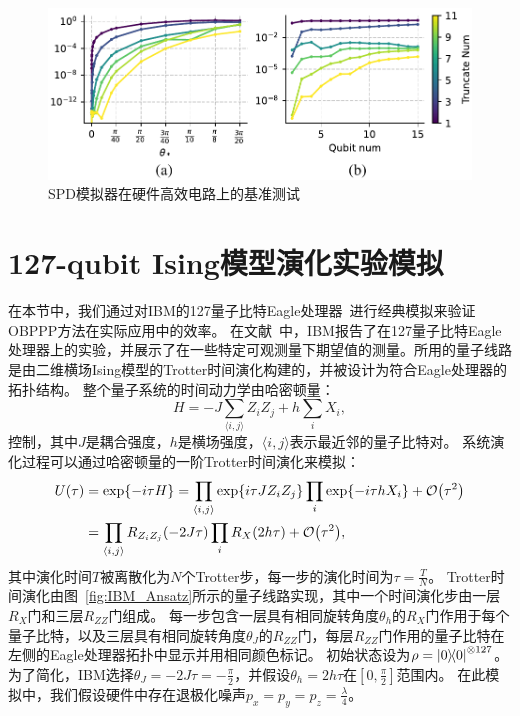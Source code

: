 \begin{figure}[!ht]
    \centering
\includegraphics[width=\textwidth]{figures/SPD_benchmark.pdf}
    \caption{SPD模拟器在硬件高效电路上的基准测试}
\label{fig:bench_mini_AQC}
\end{figure}

\section{127-qubit Ising模型演化实验模拟}



在本节中，我们通过对IBM的127量子比特Eagle处理器~\cite{kim2023evidence}进行经典模拟来验证OBPPP方法在实际应用中的效率。
在文献~\cite{kim2023evidence}中，IBM报告了在127量子比特Eagle处理器上的实验，并展示了在一些特定可观测量下期望值的测量。所用的量子线路是由二维横场Ising模型的Trotter时间演化构建的，并被设计为符合Eagle处理器的拓扑结构。
整个量子系统的时间动力学由哈密顿量：
\begin{equation}
  H=-J\sum_{\langle i,j\rangle} Z_iZ_j+h\sum_i X_i,
\end{equation}
控制，其中$J$是耦合强度，$h$是横场强度，$\langle i,j\rangle$表示最近邻的量子比特对。
系统演化过程可以通过哈密顿量的一阶Trotter时间演化来模拟：
\begin{equation}
    \begin{aligned}
        U(\tau)&=\exp{-i\tau H}=\prod_{\langle i,j\rangle} \exp{i\tau J Z_iZ_j}\prod_i \exp{-i\tau h X_i}+\order{\tau^2}\\
        &=\prod_{\langle i,j\rangle}R_{Z_iZ_j}(-2J\tau) \prod_i R_X(2h\tau)+\order{\tau^2},
    \end{aligned}
\end{equation}
其中演化时间$T$被离散化为$N$个Trotter步，每一步的演化时间为$\tau = \frac{T}{N}$。
Trotter时间演化由图~\ref{fig:IBM_Ansatz}所示的量子线路实现，其中一个时间演化步由一层$R_X$门和三层$R_{ZZ}$门组成。
每一步包含一层具有相同旋转角度$\theta_h$的$R_X$门作用于每个量子比特，以及三层具有相同旋转角度$\theta_J$的$R_{ZZ}$门，每层$R_{ZZ}$门作用的量子比特在左侧的Eagle处理器拓扑中显示并用相同颜色标记。
初始状态设为$\rho=\ketbra{0}{0}^{\otimes 127}$。
为了简化，IBM选择$\theta_J=-2J\tau=-\frac{\pi}{2}$，并假设$\theta_h=2h\tau$在$[0,\frac{\pi}{2}]$范围内。
在此模拟中，我们假设硬件中存在退极化噪声$p_x = p_y = p_z = \frac{\lambda}{4}$。

